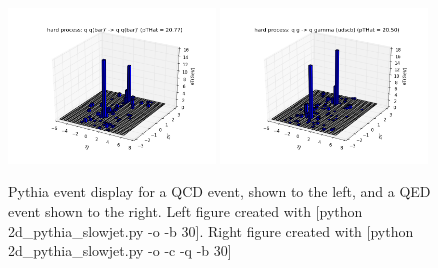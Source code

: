 \documentclass[11pt]{article}
\begin{document}
\begin{figure}[h]
\begin{center}
\includegraphics[width=0.49\textwidth]{2d_pythia_slowjet1.png}
\includegraphics[width=0.49\textwidth]{2d_pythia_slowjet2.png}
\label{fig_label}
\caption{Pythia event display for a QCD event, shown to the left, and a QED event shown to the right.  Left figure created with [python 2d\_pythia\_slowjet.py -o -b 30]. Right figure created with [python 2d\_pythia\_slowjet.py -o -c -q -b 30]}
\end{center}
\end{figure}
\end{document}
